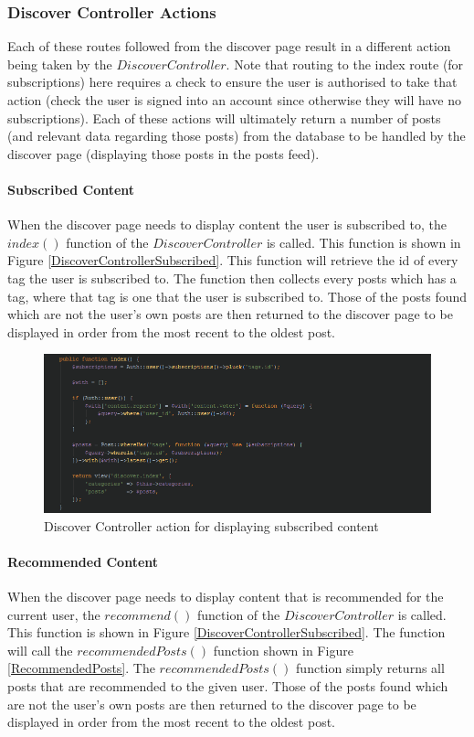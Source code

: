 \subsubsection{Discover Controller Actions}
Each of these routes followed from the discover page result in a different action being taken by the \(DiscoverController\). Note that routing to the index route (for subscriptions) here requires a check to ensure the user is authorised to take that action (check the user is signed into an account since otherwise they will have no subscriptions). Each of these actions will ultimately return a number of posts (and relevant data regarding those posts) from the database to be handled by the discover page (displaying those posts in the posts feed).

\paragraph{Subscribed Content}
When the discover page needs to display content the user is subscribed to, the \(index()\) function of the \(DiscoverController\) is called. This function is shown in Figure \ref{DiscoverControllerSubscribed}. This function will retrieve the id of every tag the user is subscribed to. The function then collects every posts which has a tag, where that tag is one that the user is subscribed to. Those of the posts found which are not the user's own posts are then returned to the discover page to be displayed in order from the most recent to the oldest post.

\begin{figure}[H]
\centering
\includegraphics[width=\textwidth]{Images/Implementation/DiscoverControllerSubscribed}
\caption{Discover Controller action for displaying subscribed content}
\label{fig:DiscoverControllerSubscribed}
\end{figure}

\paragraph{Recommended Content}
When the discover page needs to display content that is recommended for the current user, the \(recommend()\) function of the \(Discover  Controller\) is called. This function is shown in Figure \ref{DiscoverControllerSubscribed}. The function will call the \(recommendedPosts()\) function shown in Figure \ref{RecommendedPosts}. The \(recommendedPosts()\) function simply returns all posts that are recommended to the given user. Those of the posts found which are not the user's own posts are then returned to the discover page to be displayed in order from the most recent to the oldest post.

